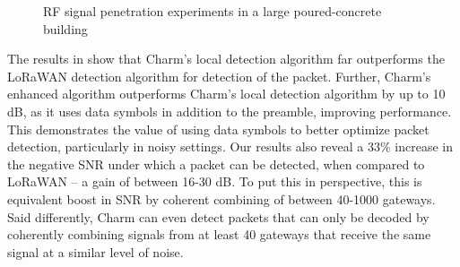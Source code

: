 \begin{figure}[!t]
\centering
\vspace{-20pt}
\hfill
{}
\vspace{-10pt}
\caption{RF signal penetration experiments in a large poured-concrete building}
\label{fig:penetration-test}
\compactimg
\end{figure}

The results in  show that Charm's local detection
algorithm far outperforms the LoRaWAN detection algorithm for detection of the
packet. Further, Charm's enhanced algorithm outperforms Charm's local
detection algorithm by up to 10 dB, as it uses data symbols in addition to the
preamble, improving performance. This demonstrates the value of using data
symbols to better optimize packet detection, particularly in noisy settings.
Our results also reveal a 33\% increase in the negative SNR under which a
packet can be detected, when compared to LoRaWAN -- a gain of between 16-30
dB. To put this in perspective, this is equivalent boost in SNR by coherent
combining of between 40-1000 gateways. Said differently, Charm can even detect
packets that can only be decoded by coherently combining signals from at least
40 gateways that receive the same signal at a similar level of noise.

